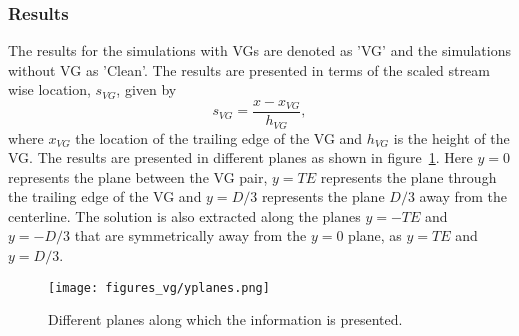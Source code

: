\subsubsection{Results}
The results for the simulations with VGs are denoted as 'VG' and the simulations without VG as 'Clean'. The results are presented in terms of the scaled stream wise location, $s_{VG}$,  given by
\begin{equation*}
s_{VG} = \frac{x-x_{VG}}{h_{VG}},
\end{equation*}
where $x_{VG}$ the location of the trailing edge of the VG and $h_{VG}$ is the height of the VG. The results are presented in different planes as shown in figure~\ref{fig:yplanesvg}. Here $y=0$ represents the plane between the VG pair, $y=TE$ represents the plane through the trailing edge of the VG and $y=D/3$ represents the plane $D/3$ away from the centerline. The solution is also extracted along the planes $y=-TE$ and $y=-D/3$ that are symmetrically away from the $y=0$ plane, as $y=TE$ and $y=D/3$.
\begin{figure}[h!]
\centering
\captionsetup{justification=centering}
\texttt{[image: figures\_vg/yplanes.png]}
\caption{Different planes along which the information is presented. }
\label{fig:yplanesvg}
\end{figure}

